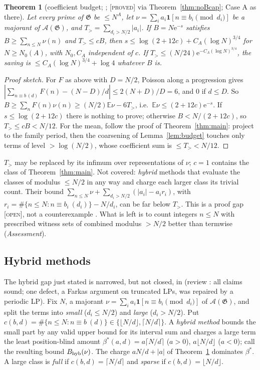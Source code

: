 \documentclass[10pt,reqno]{amsart}
\newtheorem{theorem}{Theorem}[section]
\theoremstyle{definition}
\theoremstyle{remark}
\newcommand{\A}{\mathcal A}
\newcommand{\cG}{\mathfrak G}
\newcommand{\E}{\mathbb E}
\newcommand{\ind}{\mathbf 1}
\newcommand{\e}{\mathrm e}
\newcommand{\lab}[1]{\textup{[\textsc{#1}]}}
\begin{document}
\begin{theorem}[coefficient budget; {\cite[Lemma~2.4, Thm~2.5, Rem.~2.6]{IF}}; \lab{proved} via Theorem~\ref{thm:noBcap}; Case A as there]\label{thm:IFbudget}
Let every prime of $\cG$ be $\leq N^A$, let $\nu=\sum_ia_i\ind[n\equiv b_i\pmod{d_i}]$ be
a majorant of $\A(\cG)$, and $T_>=\sum_{d_i>N/2}|a_i|$.  If $B=N\e^{-s}$ satisfies
$B\geq\sum_{n\leq N}\nu(n)$ and $T_>\leq cB$, then $s\leq\log(2+12c)+C_A(\log N)^{3/4}$
for $N\geq N_0(A)$, with $N_0,C_A$ independent of $c$.  If
$T_>\leq(N/24)\e^{-C_A(\log N)^{3/4}}$, the saving is $\leq C_A(\log N)^{3/4}+\log4$
whatever $B$ is.
\end{theorem}
\begin{proof}[Proof sketch]
For $F$ as above with $D=N/2$, Poisson along a progression gives
$|\sum_{n\equiv b\,(d)}F(n)-(N-D)/d|\leq2(N+D)/D=6$, and $0$ if $d\leq D$.  So
$B\geq\sum_nF(n)\nu(n)\geq(N/2)\E\nu-6T_>$, i.e.\ $\E\nu\leq(2+12c)\e^{-s}$.  If
$s\leq\log(2+12c)$ there is nothing to prove; otherwise $B<N/(2+12c)$, so
$T_>\leq cB<N/12$.  For the mean, follow the proof of Theorem~\ref{thm:main}:
project to the family period, then the coarsening of
Lemma~\ref{lem:budget} touches only terms of level $>\log(N/2)$, whose
coefficient sum is $\leq T_><N/12$.
\end{proof}
$T_>$ may be replaced by its infimum over representations of $\nu$; $c=1$
contains the class of Theorem~\ref{thm:main}.  Not covered: \emph{hybrid}
methods that evaluate the classes of modulus $\leq N/2$ in any way and
charge each larger class its trivial count.  Their bound
$\sum_{n\leq N}\nu+\sum_{d_i>N/2}(|a_i|-a_ir_i)$, with
$r_i=\#\{n\leq N:n\equiv b_i\ (d_i)\}-N/d_i$, can be far below $T_>$.  This is a
proof gap \lab{open}, not a counterexample \cite[Rem.~2.6]{IF}.  What is
left is to count integers $n\leq N$ with prescribed witness sets of combined
modulus $>N/2$ better than termwise (\emph{Assessment}).

\subsection{Hybrid methods}\label{sec:hybrid}
The hybrid gap just stated is narrowed, but not closed, in \cite{IF2}
(review \cite{IF2rev}: all claims sound; one defect, a Farkas argument on
truncated LPs, was repaired by a periodic LP).  Fix $N$, a majorant
$\nu=\sum_ia_i\ind[n\equiv b_i\pmod{d_i}]$ of $\A(\cG)$, and split the terms into
\emph{small} ($d_i\leq N/2$) and \emph{large} ($d_i>N/2$).  Put
$c(b,d)=\#\{n\leq N:n\equiv b\ (d)\}\in\{\lfloor N/d\rfloor,\lceil N/d\rceil\}$.  A
\emph{hybrid method} \cite[Def.~1.2]{IF2} bounds the small part by any valid
upper bound for its interval sum and charges a large term the least
position-blind amount $\beta^*(a,d)=a\lceil N/d\rceil$ ($a>0$), $a\lfloor N/d\rfloor$ ($a<0$);
call the resulting bound $B_{\rm hyb}(\nu)$.  The charge
$aN/d+|a|$ of Theorem~\ref{thm:IFbudget} dominates $\beta^*$.  A large class is
\emph{full} if $c(b,d)=\lceil N/d\rceil$ and \emph{sparse} if $c(b,d)=\lfloor N/d\rfloor$.
\end{document}
